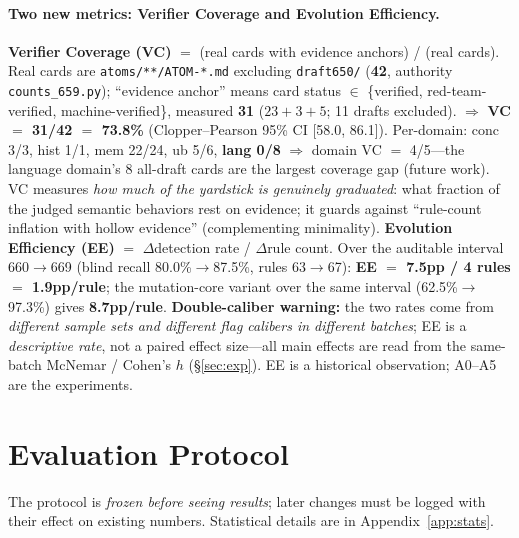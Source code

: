 \documentclass{article}
\begin{document}
\paragraph{Two new metrics: Verifier Coverage and Evolution Efficiency.}
\textbf{Verifier Coverage (VC)} $=$ (real cards with evidence anchors) / (real cards). Real cards
are \texttt{atoms/**/ATOM-*.md} excluding \texttt{draft650/} (\textbf{42}, authority
\texttt{counts\_659.py}); ``evidence anchor'' means card status $\in$ \{verified,
red-team-verified, machine-verified\}, measured \textbf{31} ($23+3+5$; 11 drafts excluded).
$\Rightarrow$ \textbf{VC $=$ 31/42 $=$ 73.8\%} (Clopper--Pearson 95\% CI [58.0, 86.1]).
Per-domain: conc 3/3, hist 1/1, mem 22/24, ub 5/6, \textbf{lang 0/8} $\Rightarrow$ domain VC
$=$ 4/5---the language domain's 8 all-draft cards are the largest coverage gap (future work).
VC measures \emph{how much of the yardstick is genuinely graduated}: what fraction of the judged
semantic behaviors rest on evidence; it guards against ``rule-count inflation with hollow
evidence'' (complementing minimality).
\textbf{Evolution Efficiency (EE)} $=$ $\Delta$detection rate / $\Delta$rule count. Over the
auditable interval 660$\to$669 (blind recall 80.0\%$\to$87.5\%, rules 63$\to$67):
\textbf{EE $=$ 7.5pp / 4 rules $=$ 1.9pp/rule}; the mutation-core variant over the same interval
(62.5\%$\to$97.3\%) gives \textbf{8.7pp/rule}. \textbf{Double-caliber warning:} the two rates come
from \emph{different sample sets and different flag calibers in different batches}; EE is a
\emph{descriptive rate}, not a paired effect size---all main effects are read from the same-batch
McNemar / Cohen's $h$ (\S\ref{sec:exp}). EE is a historical observation; A0--A5 are the
experiments.

\section{Evaluation Protocol}
\label{sec:protocol}
The protocol is \emph{frozen before seeing results}; later changes must be logged with their effect
on existing numbers. Statistical details are in Appendix~\ref{app:stats}.
\end{document}
